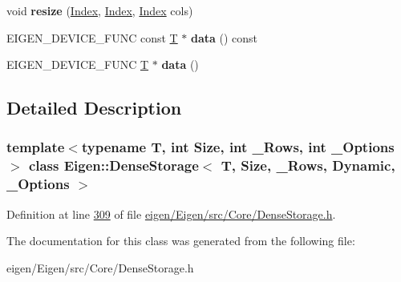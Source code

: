 \begin{DoxyCompactItemize}
\item 
\mbox{\label{class_eigen_1_1_dense_storage_3_01_t_00_01_size_00_01___rows_00_01_dynamic_00_01___options_01_4_a67d531fdf50724450693b0016a7fbd1a}} 
void {\bfseries resize} (\hyperlink{namespace_eigen_a62e77e0933482dafde8fe197d9a2cfde}{Index}, \hyperlink{namespace_eigen_a62e77e0933482dafde8fe197d9a2cfde}{Index}, \hyperlink{namespace_eigen_a62e77e0933482dafde8fe197d9a2cfde}{Index} cols)
\item 
\mbox{\label{class_eigen_1_1_dense_storage_3_01_t_00_01_size_00_01___rows_00_01_dynamic_00_01___options_01_4_abc6a40ceb60a7351a903c1bb9f0548e4}} 
E\+I\+G\+E\+N\+\_\+\+D\+E\+V\+I\+C\+E\+\_\+\+F\+U\+NC const \hyperlink{group___sparse_core___module}{T} $\ast$ {\bfseries data} () const
\item 
\mbox{\label{class_eigen_1_1_dense_storage_3_01_t_00_01_size_00_01___rows_00_01_dynamic_00_01___options_01_4_ac0aac3e4072b2a62f013ccb20faaf70c}} 
E\+I\+G\+E\+N\+\_\+\+D\+E\+V\+I\+C\+E\+\_\+\+F\+U\+NC \hyperlink{group___sparse_core___module}{T} $\ast$ {\bfseries data} ()
\end{DoxyCompactItemize}


\subsection{Detailed Description}
\subsubsection*{template$<$typename T, int Size, int \+\_\+\+Rows, int \+\_\+\+Options$>$\newline
class Eigen\+::\+Dense\+Storage$<$ T, Size, \+\_\+\+Rows, Dynamic, \+\_\+\+Options $>$}



Definition at line \hyperlink{eigen_2_eigen_2src_2_core_2_dense_storage_8h_source_l00309}{309} of file \hyperlink{eigen_2_eigen_2src_2_core_2_dense_storage_8h_source}{eigen/\+Eigen/src/\+Core/\+Dense\+Storage.\+h}.



The documentation for this class was generated from the following file\+:\begin{DoxyCompactItemize}
\item 
eigen/\+Eigen/src/\+Core/\+Dense\+Storage.\+h\end{DoxyCompactItemize}
